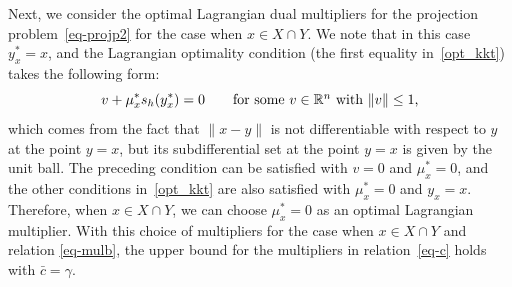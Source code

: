 \documentclass{article}
\theoremstyle{plain}
\theoremstyle{definition}
\theoremstyle{remark}
\begin{document}
Next, we consider the optimal Lagrangian dual multipliers for the projection problem~\eqref{eq-projp2} for the case when $x\in X\cap Y$. We note that in this case $y^*_x=x$, and the Lagrangian optimality condition (the first equality in~\eqref{opt_kkt}) takes the following form:
\[v+\mu_x^*s_h(y^*_x)=0\qquad\hbox{for some $v\in\mathbb{R}^n$
with $\|v\|\le 1$,}\]
which comes from the fact that $\|x - y\|$ is not differentiable with respect to $y$ at the point $y=x$, but its subdifferential set at the point $y=x$ is given by the unit ball. The preceding condition can be satisfied with $v=0$ and $\mu^*_x=0$, and the other conditions in~\eqref{opt_kkt} are also satisfied with $\mu^*_x=0$ and $y_x=x$. 
Therefore, when $x\in X\cap Y$, we can choose $\mu^*_x=0$ as an optimal Lagrangian multiplier. With this choice of multipliers for the case when $x\in X\cap Y$ and relation 
\eqref{eq-mulb}, the upper bound for the multipliers in relation~\eqref{eq-c} holds with
$\bar c=\gamma$.
\end{document}
